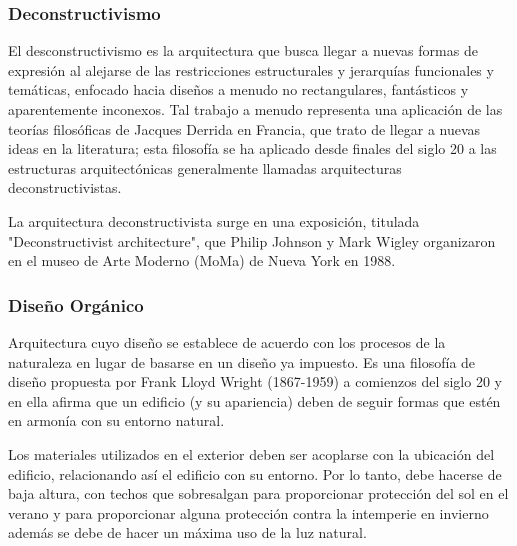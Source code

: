 \subsubsection{Deconstructivismo}
El desconstructivismo es la arquitectura que busca llegar a nuevas formas de expresión al alejarse de las restricciones estructurales y jerarquías funcionales y temáticas, enfocado 
hacia diseños a menudo no rectangulares, fantásticos y aparentemente inconexos\cite{B24}. Tal trabajo a menudo representa una aplicación de las teorías filosóficas  de Jacques Derrida en Francia, que trato de llegar a nuevas ideas en la literatura; esta filosofía se ha aplicado desde finales del siglo 20 a las estructuras arquitectónicas generalmente llamadas arquitecturas deconstructivistas. \par
La arquitectura deconstructivista surge en una exposición, titulada "Deconstructivist architecture", que Philip Johnson y Mark Wigley organizaron en el museo de Arte Moderno (MoMa) de Nueva York en 1988.

\subsubsection{Diseño Orgánico}
Arquitectura cuyo diseño se establece de acuerdo con los procesos de la naturaleza en lugar de basarse en un diseño ya impuesto. Es una filosofía de diseño propuesta por Frank Lloyd Wright (1867-1959) a comienzos del siglo 20 y en ella afirma que un edificio (y su apariencia) deben de seguir formas que estén en armonía con su entorno natural.\cite{B24}\par  
Los materiales utilizados en el exterior deben ser acoplarse con la ubicación del edificio, relacionando así el edificio con su entorno. Por lo tanto, debe hacerse de baja altura, con techos que sobresalgan para proporcionar protección del sol en el verano y para proporcionar alguna protección contra la intemperie en invierno además se debe de hacer un máxima uso de la luz natural.

